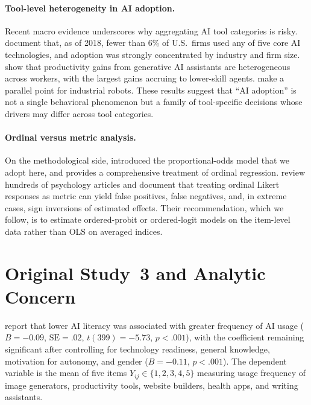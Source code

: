 \documentclass[11pt]{article}
\begin{document}
\paragraph{Tool-level heterogeneity in AI adoption.} Recent macro evidence
underscores why aggregating AI tool categories is risky. \citet{mcelheran2024ai}
document that, as of 2018, fewer than 6\% of U.S.\ firms used any of five core
AI technologies, and adoption was strongly concentrated by industry and firm
size. \citet{brynjolfsson2025generative} show that productivity gains from
generative AI assistants are heterogeneous across workers, with the largest
gains accruing to lower-skill agents. \citet{acemoglu2020robots} make a
parallel point for industrial robots. These results suggest that
``AI adoption'' is not a single behavioral phenomenon but a family of
tool-specific decisions whose drivers may differ across tool categories.

\paragraph{Ordinal versus metric analysis.} On the methodological side,
\citet{mccullagh1980regression} introduced the proportional-odds model that we
adopt here, and \citet{agresti2010analysis} provides a comprehensive treatment
of ordinal regression. \citet{liddell2018analyzing} review hundreds of
psychology articles and document that treating ordinal Likert responses as
metric can yield false positives, false negatives, and, in extreme
cases, sign inversions of estimated effects. Their recommendation, which we
follow, is to estimate ordered-probit or ordered-logit models on the
item-level data rather than OLS on averaged indices.

\section{Original Study~3 and Analytic Concern}

\citet{tully2025lower} report that lower AI literacy was associated with
greater frequency of AI usage
($B = -0.09$, $\mathrm{SE} = .02$, $t(399) = -5.73$, $p < .001$), with the
coefficient remaining significant after controlling for technology readiness,
general knowledge, motivation for autonomy, and gender ($B = -0.11$, $p <
.001$). The dependent variable is the mean of five items
$Y_{ij} \in \{1, 2, 3, 4, 5\}$ measuring usage frequency of image generators,
productivity tools, website builders, health apps, and writing assistants.
\end{document}
